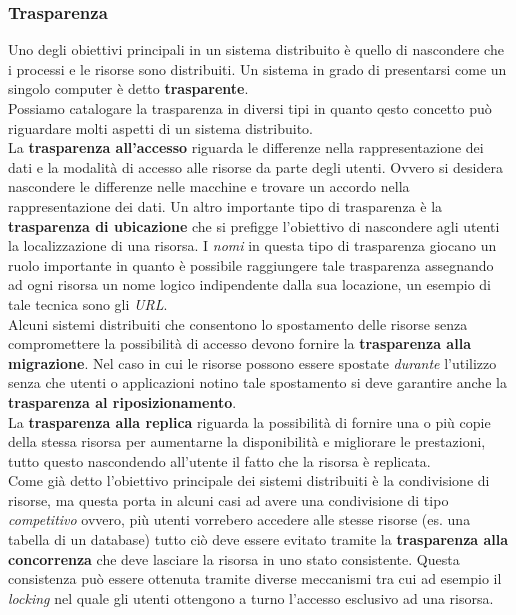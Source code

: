 \subsubsection{Trasparenza}
Uno degli obiettivi principali in  un sistema distribuito è quello di nascondere che i processi e le risorse sono distribuiti. Un sistema in grado di presentarsi come un singolo computer è detto \textbf{trasparente}.\\
Possiamo catalogare la trasparenza in diversi tipi in quanto qesto concetto può riguardare molti aspetti di un sistema distribuito.\\
La \textbf{trasparenza all'accesso} riguarda le differenze nella rappresentazione dei dati e la modalità di accesso alle risorse da parte degli utenti. Ovvero si desidera nascondere le differenze nelle macchine e trovare un accordo nella rappresentazione dei dati.
Un altro importante tipo di trasparenza è la \textbf{trasparenza di ubicazione} che si prefigge l'obiettivo di nascondere agli utenti la localizzazione di una risorsa. I \emph{nomi} in questa tipo di trasparenza giocano un ruolo importante in quanto è possibile raggiungere tale trasparenza assegnando ad ogni risorsa un nome logico indipendente dalla sua locazione, un esempio di tale tecnica sono gli \emph{URL}.\\
Alcuni sistemi distribuiti che consentono lo spostamento delle risorse senza compromettere la possibilità di accesso devono fornire la \textbf{trasparenza alla migrazione}. Nel caso in cui le risorse possono essere spostate \emph{durante} l'utilizzo senza che utenti o applicazioni notino tale spostamento si deve garantire anche la \textbf{trasparenza al riposizionamento}.\\
La \textbf{trasparenza alla replica} riguarda la possibilità di fornire una o più copie della stessa risorsa per aumentarne la disponibilità e migliorare le prestazioni, tutto questo nascondendo all'utente il fatto che la risorsa è replicata.\\
Come già detto l'obiettivo principale dei sistemi distribuiti è la condivisione di risorse, ma questa porta in alcuni casi ad avere una condivisione di tipo \emph{competitivo} ovvero, più utenti vorrebero accedere alle stesse risorse (es. una tabella di un database) tutto ciò deve essere evitato tramite la \textbf{trasparenza alla concorrenza} che deve lasciare la risorsa in uno stato consistente. Questa consistenza può essere ottenuta tramite diverse meccanismi tra cui ad esempio il \emph{locking} nel quale gli utenti ottengono a turno l'accesso esclusivo ad una risorsa.\\
